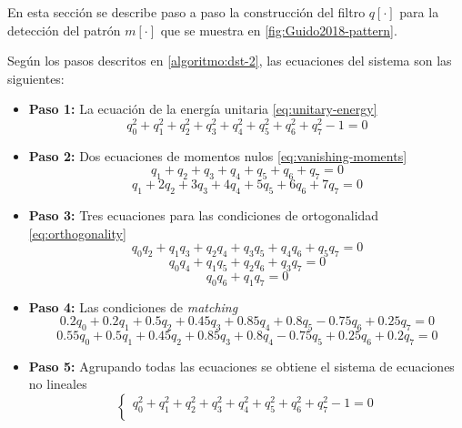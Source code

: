 En esta sección se describe paso a paso la construcción del filtro $q[\cdot]$ para la detección del
patrón $m[\cdot]$ que se muestra en \ref{fig:Guido2018-pattern}. 

Según los pasos descritos en \ref{algoritmo:dst-2}, las ecuaciones del sistema son las siguientes:

\begin{itemize}
	\item \textbf{Paso 1:} La ecuación de la energía unitaria \ref{eq:unitary-energy}
		\begin{equation}
			q_0^2 + q_1^2 + q_2^2 + q_3^2 + q_4^2 + q_5^2 + q_6^2 + q_7^2 - 1 = 0
		\end{equation}
	\item \textbf{Paso 2:} Dos ecuaciones de momentos nulos \ref{eq:vanishing-moments}
		\begin{equation}
			q_1 + q_2 + q_3 + q_4 + q_5 + q_6 + q_7  = 0
		\end{equation}
		\begin{equation}
			q_1 + 2q_2 + 3q_3 + 4q_4 + 5q_5 + 6q_6 + 7q_7 = 0
		\end{equation}
	\item \textbf{Paso 3:} Tres ecuaciones para las condiciones de ortogonalidad \ref{eq:orthogonality}
		\begin{equation}
			q_0q_2 + q_1q_3 + q_2q_4 + q_3q_5 + q_4q_6 + q_5q_7 = 0
		\end{equation}
		\begin{equation}
			q_0q_4 + q_1q_5 + q_2q_6 + q_3q_7 = 0
		\end{equation}
		\begin{equation}
			q_0q_6 + q_1q_7 = 0
		\end{equation}
	\item \textbf{Paso 4:} Las condiciones de \textit{matching} 
		\begin{equation}
			0.2q_0 + 0.2q_1 + 0.5q_2 + 0.45q_3 + 0.85q_4 + 0.8q_5 - 0.75q_6 + 0.25q_7 = 0
		\end{equation}
		\begin{equation}
			0.55q_0 + 0.5q_1 + 0.45q_2 + 0.85q_3 + 0.8q_4 - 0.75q_5 + 0.25q_6 + 0.2q_7 = 0
		\end{equation}
	\item \textbf{Paso 5:} Agrupando todas las ecuaciones se obtiene el sistema de ecuaciones no lineales
		\begin{equation}\label{eq:system}
			\left\{ \begin{array}{rcl}
						q_0^2 + q_1^2 + q_2^2 + q_3^2 + q_4^2 + q_5^2 + q_6^2 + q_7^2 - 1 = 0 \\

\end{array}
\end{equation}
\end{itemize}
